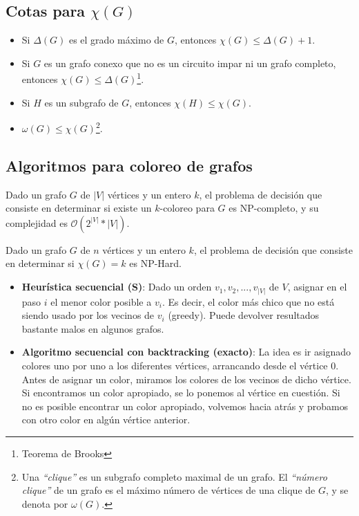 \subsection{Cotas para $\chi(G)$}
\begin{itemize}
\item Si $\Delta(G)$ es el grado m\'aximo de $G$, entonces $\chi(G) \leq \Delta(G) + 1$.
\item Si $G$ es un grafo conexo que no es un circuito impar ni un grafo completo, entonces $\chi(G) \leq \Delta(G)$\footnote{Teorema de Brooks}.
\item Si $H$ es un subgrafo de $G$, entonces $\chi(H) \leq \chi(G)$.
\item $\omega(G) \leq \chi(G)$\footnote{Una \emph{``clique''} es un subgrafo completo maximal de un grafo. El \emph{``n\'umero clique''} de un grafo es el m\'aximo n\'umero de v\'ertices de una clique de $G$, y se denota por $\omega(G)$.}.
\end{itemize}



\newpage
\subsection{Algoritmos para coloreo de grafos}

Dado un grafo $G$ de $|V|$ v\'ertices y un entero $k$, el problema de decisi\'on que consiste en determinar si existe un $k$-coloreo para $G$ es NP-completo, y su complejidad es  $\mathcal{O}(2^{|V|} * |V|)$.

Dado un grafo $G$ de $n$ v\'ertices y un entero $k$, el problema de decisi\'on que consiste en determinar si $\chi(G) = k$ es NP-Hard.

\begin{itemize}
\item \textbf{Heur\'istica secuencial (S)}: Dado un orden $v_1, v_2, ..., v_{|V|}$ de $V$, asignar en el paso $i$ el menor color posible a $v_i$. Es decir, el color m\'as chico que no est\'a siendo usado por los vecinos de $v_i$ (greedy). Puede devolver resultados bastante malos en algunos grafos.
\item \textbf{Algoritmo secuencial con backtracking (exacto)}: La idea es ir asignado colores uno por uno a los diferentes v\'ertices, arrancando desde el v\'ertice 0. Antes de asignar un color, miramos los colores de los vecinos de dicho v\'ertice. Si encontramos un color apropiado, se lo ponemos al v\'ertice en cuesti\'on. Si no es posible encontrar un color apropiado, volvemos hacia atr\'as y probamos con otro color en alg\'un v\'ertice anterior.
\end{itemize}


